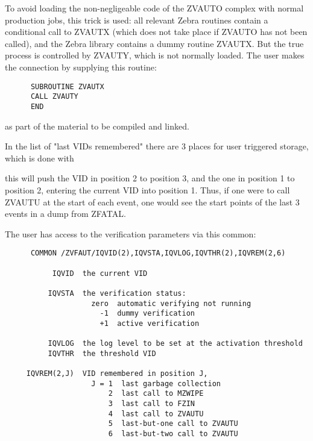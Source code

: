 To avoid loading the non-negligeable code of the ZVAUTO complex with
normal production jobs, this trick is used: all relevant Zebra routines
contain a conditional call to ZVAUTX (which does not take place if
ZVAUTO has not been called), and the Zebra library contains a dummy
routine ZVAUTX. But the true process is controlled by ZVAUTY, which
is not normally loaded. The user makes the connection by supplying
this routine:

\begin{verbatim}
      SUBROUTINE ZVAUTX
      CALL ZVAUTY
      END
\end{verbatim} 
as part of the material to be compiled and linked.

In the list of "last VIDs remembered" there are 3 places for user
triggered storage, which is done with

                 
this will push the VID in position 2 to position 3, and the one in
position 1 to position 2, entering the current VID into position 1.
Thus, if one were to call ZVAUTU at the start of each event,
one would see the start points of the last 3 events in a dump
from ZFATAL.

The user has access to the verification parameters via this common:

\begin{verbatim}
      COMMON /ZVFAUT/IQVID(2),IQVSTA,IQVLOG,IQVTHR(2),IQVREM(2,6)

           IQVID  the current VID

          IQVSTA  the verification status:
                    zero  automatic verifying not running
                      -1  dummy verification
                      +1  active verification

          IQVLOG  the log level to be set at the activation threshold
          IQVTHR  the threshold VID

     IQVREM(2,J)  VID remembered in position J,
                    J = 1  last garbage collection
                        2  last call to MZWIPE
                        3  last call to FZIN
                        4  last call to ZVAUTU
                        5  last-but-one call to ZVAUTU
                        6  last-but-two call to ZVAUTU
\end{verbatim} 


